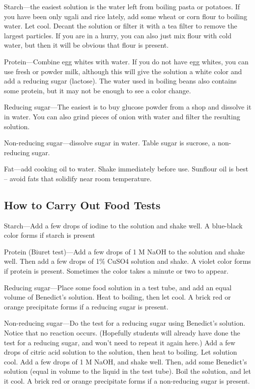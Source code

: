 \begin{enumerate}
Starch—the easiest solution is the water left from boiling pasta or potatoes. If you have been only ugali and rice lately, add some wheat or corn flour to boiling water. Let cool. Decant the solution or filter it with a tea filter to remove the largest particles. If you are in a hurry, you can also just mix flour with cold water, but then it will be obvious that flour is present.

Protein—Combine egg whites with water. If you do not have egg whites, you can use fresh or powder milk, although this will give the solution a white color and add a reducing sugar (lactose). The water used in boiling beans also contains some protein, but it may not be enough to see a color change.

Reducing sugar—The easiest is to buy glucose powder from a shop and dissolve it in water. You can also grind pieces of onion with water and filter the resulting solution.

Non-reducing sugar—dissolve sugar in water. Table sugar is sucrose, a non-reducing sugar.

Fat—add cooking oil to water. Shake immediately before use. Sunflour oil is best – avoid fats that solidify near room temperature.

\subsection{How to Carry Out Food Tests}

Starch—Add a few drops of iodine to the solution and shake well. A blue-black color forms if starch is present

Protein (Biuret test)—Add a few drops of 1 M NaOH to the solution and shake well. Then add a few drops of 1\% CuSO4 solution and shake. A violet color forms if protein is present. Sometimes the color takes a minute or two to appear. 

Reducing sugar—Place some food solution in a test tube, and add an equal volume of Benedict’s solution. Heat to boiling, then let cool. A brick red or orange precipitate forms if a reducing sugar is present.

Non-reducing sugar—Do the test for a reducing sugar using Benedict's solution. Notice that no reaction occurs. (Hopefully students will already have done the test for a reducing sugar, and won't need to repeat it again here.) Add a few drops of citric acid solution to the solution, then heat to boiling. Let solution cool. Add a few drops of 1 M NaOH, and shake well. Then, add some Benedict’s solution (equal in volume to the liquid in the test tube). Boil the solution, and let it cool. A brick red or orange precipitate forms if a non-reducing sugar is present.


\end{enumerate}
